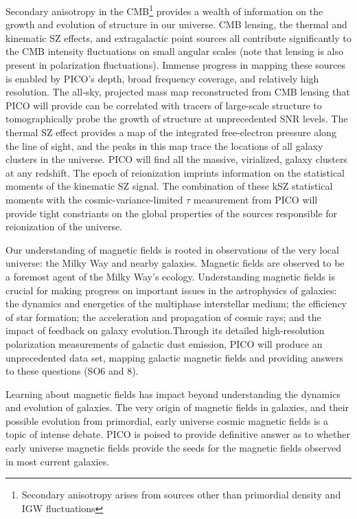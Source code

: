 \documentclass[PICOReport.tex]{subfiles}
\begin{document}
Secondary anisotropy in the CMB\footnote{Secondary anisotropy arises from sources other than primordial density and \ac{IGW} fluctuations} provides a wealth of information on the growth and evolution of structure in our universe. CMB lensing, the thermal and kinematic \ac{SZ} effects, and extragalactic point sources all contribute significantly to the CMB intensity fluctuations on small angular scales (note that lensing is also present in polarization fluctuations). Immense progress in mapping these sources is enabled by PICO's depth, broad frequency coverage, and relatively high resolution. The all-sky, projected mass map reconstructed from CMB lensing that PICO will provide can be correlated with tracers of large-scale structure to tomographically probe the growth of structure at unprecedented \ac{SNR} levels. The thermal SZ effect provides a map of the integrated free-electron pressure along the line of sight, and the peaks in this map trace the locations of all galaxy clusters in the universe. PICO will find all the massive, virialized, galaxy clusters at any redshift.  The epoch of reionization imprints information on the statistical moments of the kinematic SZ signal. The combination of these kSZ statistical moments with the cosmic-variance-limited $\tau$ measurement from PICO will provide tight constriants on the global properties of the sources responsible for reionization of the universe.

Our understanding of magnetic fields is rooted in observations of the very local universe: the Milky Way and nearby galaxies. Magnetic fields are observed to be a foremost agent of the Milky Way's ecology. Understanding magnetic fields is crucial for making progress on important issues in the astrophysics of galaxies: the dynamics and energetics of the multiphase interstellar medium; the efficiency of star formation; the acceleration and propagation of cosmic rays; and the impact of feedback on galaxy evolution.Through its detailed high-resolution polarization measurements of galactic dust emission, PICO will produce an unprecedented data set, mapping galactic magnetic fields and providing answers to these questions (SO6 and 8). 

Learning about magnetic fields has impact beyond understanding the dynamics and evolution of galaxies. The very origin of magnetic fields in galaxies, and their possible evolution from primordial, early universe cosmic magnetic fields is a topic of intense debate. PICO is poised to provide definitive answer as to whether early universe magnetic fields provide the seeds for the magnetic fields observed in most current galaxies. 
\end{document}
